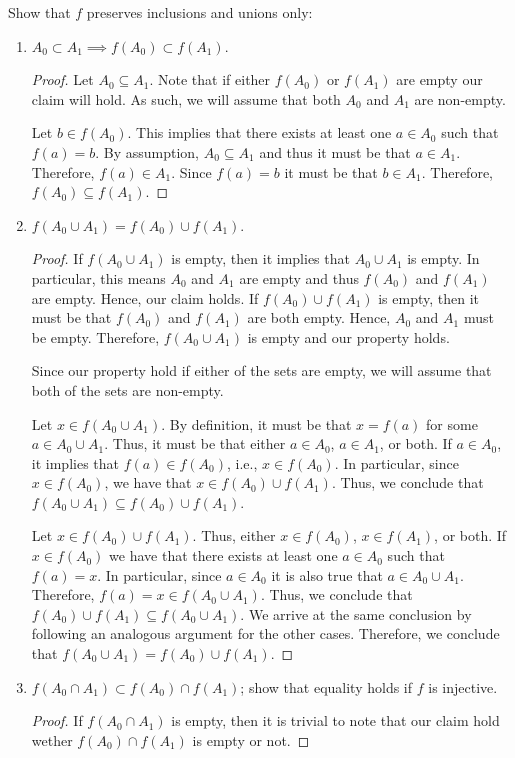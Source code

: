 \documentclass[12pt]{article}
\begin{document}
Show that $f$ preserves inclusions and unions only:
\begin{enumerate}
	\item[(e)] $A_0 \subset A_1 \implies f(A_0) \subset f(A_1)$.
	\begin{proof}
		Let $A_0 \subseteq A_1$. Note that if either $f(A_0)$ or $f(A_1)$ are empty our 
		claim will hold. As such, we will assume that both $A_0$ and $A_1$ are non-empty.
		
		Let $b \in f(A_0)$. This implies that there exists at least one $a \in A_0$
		such that $f(a) = b$. By assumption, $A_0 \subseteq A_1$ and thus it must
		be that $a \in A_1$. Therefore, $f(a) \in A_1$. Since $f(a) = b$ it must
		be that $b \in A_1$. Therefore, $f(A_0) \subseteq f(A_1)$.
	\end{proof}
	\item[(f)] $f(A_0 \cup A_1) = f(A_0) \cup f(A_1)$.
	\begin{proof}
		If $f(A_0 \cup A_1)$ is empty, then it implies that $A_0 \cup A_1$ is empty.
		In particular, this means $A_0$ and $A_1$ are empty and thus 
		$f(A_0)$ and $f(A_1)$ are empty. Hence, our claim holds. 
		If $f(A_0) \cup f(A_1)$ is empty, then it must be that $f(A_0)$ and $f(A_1)$
		are both empty. Hence, $A_0$ and $A_1$ must be empty. Therefore,
		$f(A_0 \cup A_1)$ is empty and our property holds.
		
		Since our property hold if either of the sets are empty, we will assume that 
		both of the sets are non-empty.
		
		Let $x \in f(A_0 \cup A_1)$. By definition, it must be that $x = f(a)$ for 
		some $a \in A_0 \cup A_1$. Thus, it must be that either $a \in A_0$, $a \in A_1$,
		or both. If $a \in A_0$, it implies that $f(a) \in f(A_0)$, i.e., $x \in f(A_0)$.
		In particular, since $x \in f(A_0)$, we have that $x \in f(A_0) \cup f(A_1)$.
		Thus, we conclude that $f(A_0 \cup A_1) \subseteq f(A_0) \cup f(A_1)$.
		
		Let $x \in f(A_0) \cup f(A_1)$. Thus, either $x \in f(A_0)$, $x \in f(A_1)$,
		or both. If $x \in f(A_0)$ we have that there exists at least one $a \in A_0$
		such that $f(a) = x$. In particular, since $a \in A_0$ it is also true that
		$a \in A_0 \cup A_1$. Therefore, $f(a) = x \in f(A_0 \cup A_1)$. Thus,
		we conclude that $f(A_0) \cup f(A_1) \subseteq f(A_0 \cup A_1)$. We arrive
		at the same conclusion by following an analogous argument for the other cases.
		Therefore, we conclude that $f(A_0 \cup A_1) = f(A_0) \cup f(A_1)$.
	\end{proof}
	\pagebreak
	\item[(g)] $f(A_0 \cap A_1) \subset f(A_0) \cap f(A_1)$; show that equality holds
	if $f$ is injective.
	\begin{proof}
		If $f(A_0 \cap A_1)$ is empty, then it is trivial to note that our claim hold
		wether $f(A_0) \cap f(A_1)$ is empty or not.
		

\end{proof}
\end{enumerate}
\end{document}
